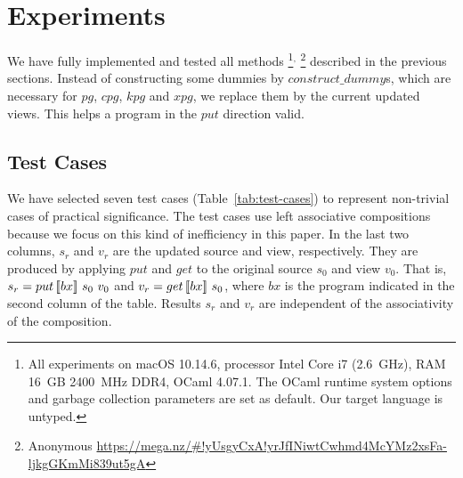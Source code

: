 \section{Experiments} \label{sect:experiments}

We have fully implemented and tested all methods%
%
\footnote{All experiments on macOS 10.14.6, processor Intel Core i7 (2.6~GHz), RAM 16~GB 2400~MHz DDR4, OCaml 4.07.1. The OCaml runtime system options and garbage collection parameters are set as default. Our target language is untyped.}$^,$%
%
\footnote{Anonymous \url{https://mega.nz/\#!yUsgyCxA!yrJfINiwtCwhmd4McYMz2xsFa-ljkgGKmMi839ut5gA}}
%
described in the previous sections.
Instead of constructing some dummies by $construct\_dummy$s, which are necessary for $pg$, $cpg$, $kpg$ and $xpg$, we replace them by the current updated views. This helps a program in the $put$ direction valid.

\subsection{Test Cases}

We have 
selected seven test cases (Table~\ref{tab:test-cases}) to 
represent
non-trivial cases of practical significance.
The test cases use
left associative compositions because we focus on this kind of inefficiency in this paper.
In the last two columns, $s_r$ and $v_r$ are the updated source and view, respectively. They are produced by applying $put$ and $get$ to the original source $s_0$ and view $v_0$. That is, $s_r = put \, [\![bx]\!] \ s_0 \ v_0$ and $v_r = get \, [\![bx]\!] \ s_0$, where $bx$ is the program indicated in the second column of the table. 
Results $s_r$ and $v_r$ are independent of the associativity 
of the composition.

